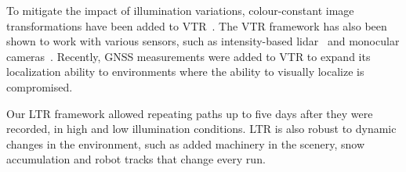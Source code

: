 To mitigate the impact of illumination variations, colour-constant image transformations have been added to \ac{VTR}~\citep{Paton2015}. 
The \ac{VTR} framework has also been shown to work with various sensors, such as intensity-based lidar~\citep{McManus2013} and monocular cameras~\citep{Clement2017}.
Recently, \ac{GNSS} measurements were added to \ac{VTR} to expand its localization ability to environments where the ability to visually localize is compromised.

Our \ac{LTR} framework allowed repeating paths up to five days after they were recorded, in high and low illumination conditions. 
\ac{LTR} is also robust to dynamic changes in the environment, such as added machinery in the scenery, snow accumulation and robot tracks that change every run.



